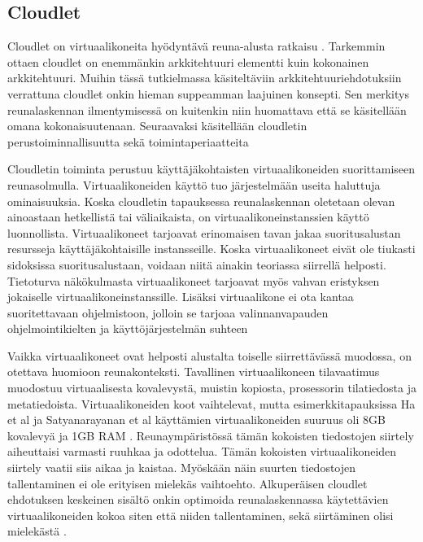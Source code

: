 \subsection{Cloudlet} \label{cloudlet}


Cloudlet on virtuaalikoneita hyödyntävä reuna-alusta ratkaisu \cite{satya09}.
Tarkemmin ottaen cloudlet on enemmänkin arkkitehtuuri elementti kuin kokonainen arkkitehtuuri. Muihin tässä tutkielmassa käsiteltäviin arkkitehtuuriehdotuksiin verrattuna cloudlet onkin hieman suppeamman laajuinen konsepti.
Sen merkitys reunalaskennan ilmentymisessä on kuitenkin niin huomattava että se käsitellään omana kokonaisuutenaan.
Seuraavaksi käsitellään cloudletin perustoiminnallisuutta sekä toimintaperiaatteita

Cloudletin toiminta perustuu käyttäjäkohtaisten virtuaalikoneiden suorittamiseen reunasolmulla.
Virtuaalikoneiden käyttö tuo järjestelmään useita haluttuja ominaisuuksia.
Koska cloudletin tapauksessa reunalaskennan oletetaan olevan ainoastaan hetkellistä tai väliaikaista\cite{satya09}, on virtuaalikoneinstanssien käyttö luonnollista.
Virtuaalikoneet tarjoavat erinomaisen tavan jakaa suoritusalustan resursseja käyttäjäkohtaisille instansseille. 
Koska virtuaalikoneet eivät ole tiukasti sidoksissa suoritusalustaan, voidaan niitä ainakin teoriassa siirrellä helposti.
Tietoturva näkökulmasta virtuaalikoneet tarjoavat myös vahvan eristyksen jokaiselle virtuaalikoneinstanssille. \cite{ha2015adaptive} 
Lisäksi virtuaalikone ei ota kantaa suoritettavaan ohjelmistoon, jolloin se tarjoaa valinnanvapauden ohjelmointikielten ja käyttöjärjestelmän suhteen

Vaikka virtuaalikoneet ovat helposti alustalta toiselle siirrettävässä muodossa, on otettava huomioon reunakonteksti. Tavallinen virtuaalikoneen tilavaatimus muodostuu virtuaalisesta kovalevystä, muistin kopiosta, prosessorin tilatiedosta ja metatiedoista.  
Virtuaalikoneiden koot vaihtelevat, mutta esimerkkitapauksissa Ha et al ja Satyanarayanan et al käyttämien virtuaalikoneiden suuruus oli 8GB kovalevyä ja  1GB RAM \cite{ha2013just, satya09}. Reunaympäristössä tämän kokoisten tiedostojen siirtely aiheuttaisi varmasti ruuhkaa ja odottelua.
Tämän kokoisten virtuaalikoneiden siirtely vaatii siis aikaa ja kaistaa. Myöskään näin suurten tiedostojen tallentaminen ei ole erityisen mielekäs vaihtoehto.
Alkuperäisen cloudlet ehdotuksen keskeinen sisältö onkin optimoida reunalaskennassa käytettävien virtuaalikoneiden kokoa siten että niiden tallentaminen, sekä siirtäminen olisi mielekästä \cite{satya09}.

